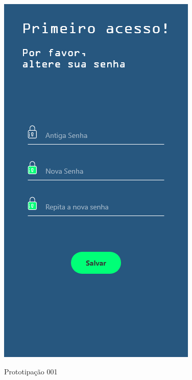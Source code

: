 \documentclass[
	12pt,				%
	openright,			%
	oneside,			%
	a4paper,			%
	english,			%
	brazil,				%
	]{abntex2}
\theoremstyle{theorem}
\theoremstyle{definition}
\begin{document}
\begin{figure}[H]
\begin{minipage}{.3\textwidth}
  \includegraphics[width=.9\linewidth]{imagens/prototipoPrimeiroAcesso.png}
  \label{fig: Tela de primeira autenticação}
\end{minipage}
\caption{Prototipação 001}
\end{figure}
\end{document}
